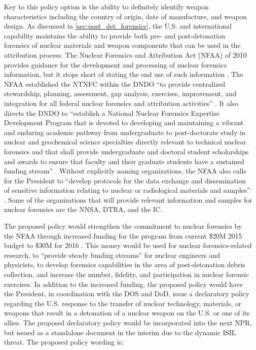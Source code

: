 \documentclass{report}
\begin{document}
Key to this policy option is the ability to definitely identify weapon characteristics including the country of origin, date of manufacture, and weapon design.  As discussed in \autoref{sec:post_det_forensics}, the U.S. and international capability maintains the ability to provide both pre- and post-detonation forensics of nuclear materials and weapon components that can be used in the attribution process.  The Nuclear Forensics and Attribution Act (NFAA) of 2010 provides guidance for the development and processing of nuclear forensics information, but it stops short of stating the end use of such information \cite{Act2010}.  The NFAA established the NTNFC within the DNDO \enquote{to provide centralized stewardship, planning, assessment, gap analysis, exercises, improvement, and integration for all federal nuclear forensics and attribution activities} \cite{Act2010}.  It also directs the DNDO to \enquote{establish a National Nuclear Forensics Expertise Development Program that is devoted to developing and maintaining a vibrant and enduring academic pathway from undergraduate to post-doctorate study in nuclear and geochemical science specialties directly relevant to technical nuclear forensics and that shall provide undergraduate and doctoral student scholarships and awards to ensure that faculty and their graduate students have a sustained funding stream} \cite{Act2010}.  Without explicitly naming organizations, the NFAA also calls for the President to \enquote{develop protocols for the data exchange and dissemination of sensitive information relating to nuclear or radiological materials and samples} \cite{Act2010}.  Some of the organizations that will provide relevant information and samples for nuclear forensics are the NNSA, DTRA, and the IC.    

The proposed policy  would strengthen the commitment to nuclear forensics by the NFAA through increased funding for the program from current \$20M 2015 budget to \$30M for 2016 \cite{Year2015}.  This money would be used for nuclear forensics-related research, to \enquote{provide steady funding streams} for nuclear engineers and physicists, to develop forensics capabilities in the area of post-detonation debris collection, and increase the number, fidelity, and participation in nuclear forensic exercises.  In addition to the increased funding, the proposed policy  would have the President, in coordination with the DOS and DoD, issue a declaratory policy regarding the U.S. response to the transfer of nuclear technology, materials, or weapons that result in a detonation of a nuclear weapon on the U.S. or one of its allies.  The proposed declaratory policy would be incorporated into the next NPR, but issued as a standalone document in the interim due to the dynamic ISIL threat.  The proposed policy wording is:
\end{document}
